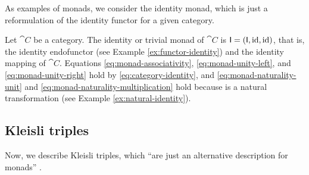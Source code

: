 As examples of monads, we consider the identity monad, which is just a
reformulation of the identity functor for a given category.

\begin{example}
  \label{ex:monad-identity}

  Let $\cat{C}$ be a category. The identity or trivial monad of
  $\cat{C}$ is $\mathsf{I} = (\mathsf{I}, \operatorname{id}, \operatorname{id})$, that is, the identity
  endofunctor (see Example \ref{ex:functor-identity}) and the identity
  mapping of $\cat{C}$. Equations \eqref{eq:monad-associativity},
  \eqref{eq:monad-unity-left}, and \eqref{eq:monad-unity-right} hold
  by \eqref{eq:category-identity}, and
  \eqref{eq:monad-naturality-unit} and
  \eqref{eq:monad-naturality-multiplication} hold because \nat{\id} is
  a natural transformation (see Example \ref{ex:natural-identity}).

\end{example}

\subsection*{Kleisli triples}

Now, we describe Kleisli triples, which ``are just an alternative
description for monads'' \parencite[60]{moggi-1991}.

